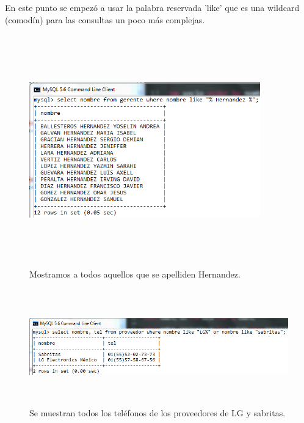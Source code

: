\documentclass[12pt, titlepage]{article}
\begin{document}
En este punto se empezó a usar la palabra reservada 'like' que es una wildcard (comodín) para las consultas un poco más complejas.
\begin{figure}[H]
    \begin{center}
        \includegraphics[width=10cm, height=10cm]{img/hernandez.png}
        \caption{Mostramos a todos aquellos que se apelliden Hernandez.}
        \label{fig:arlterotro}
    \end{center}
\end{figure}
\begin{figure}[H]
    \begin{center}
        \includegraphics[width=15cm, height=5cm]{img/sabritas.png}
        \caption{Se muestran todos los teléfonos de los proveedores de LG y sabritas.}
        \label{fig:arlter6}
    \end{center}
\end{figure}
\end{document}

